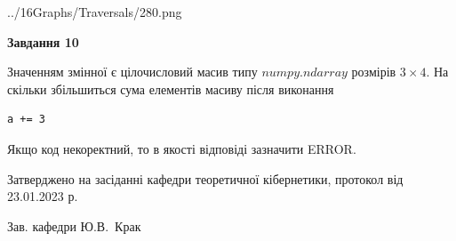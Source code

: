 \documentclass[12pt, ukrainian]{article}
\begin{document}
{\begin {large}
\begin{center}
	{../16Graphs/Traversals/280.png}
\end{center}\par
\newpage

{\begin {center}\textbf{Завдання 10}\end {center}}\par
Значенням змінної  є цілочисловий масив типу $numpy.ndarray$ розмірів $3{\times}4$. На скільки збільшиться сума елементів масиву  після виконання
\begin{verbatim}
a += 3
\end{verbatim}


Якщо код некоректний, то в якості відповіді зазначити ERROR.\par
\newpage


\end {large}
}
{\smallskip \begin {small} Затверджено на засіданні кафедри теоретичної кібернетики, протокол  від   23.01.2023 р.\par\smallskip\smallskip
{\parbox {6.5 cm}{Зав. кафедри \dotfill Ю.В.~Крак}} \end{small}}
\end{document}
